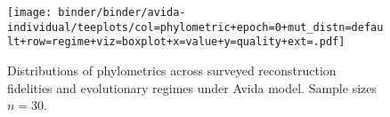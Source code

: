 \begin{sidewaysfigure*}
  \centering
  \texttt{[image: binder/binder/avida-individual/teeplots/col=phylometric+epoch=0+mut\_distn=default+row=regime+viz=boxplot+x=value+y=quality+ext=.pdf]}
  \caption{%
    Distributions of phylometrics across surveyed reconstruction fidelities and evolutionary regimes under Avida model.
    Sample sizes $n=30$.
  }
  \label{fig:reconstructed-tree-phylometrics-avida}
\end{sidewaysfigure*}
